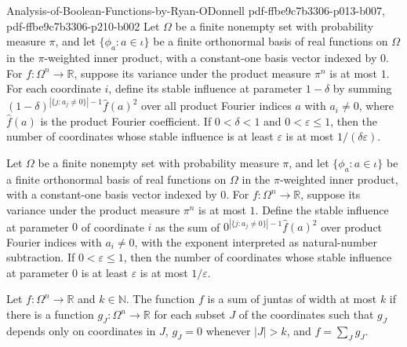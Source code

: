 \begin{theorem}
  {Analysis-of-Boolean-Functions-by-Ryan-ODonnell}
  {pdf-ffbe9c7b3306-p013-b007,
    pdf-ffbe9c7b3306-p210-b002}
Let $\Omega$ be a finite nonempty set with probability measure $\pi$, and let
$\{\phi_a:a\in\iota\}$ be a finite orthonormal basis of real functions on $\Omega$ in
the $\pi$-weighted inner product, with a constant-one basis vector indexed by $0$. For
$f:\Omega^n\to\mathbb R$, suppose its variance under the product measure $\pi^n$ is at
most $1$. For each coordinate $i$, define its stable influence at parameter $1-\delta$
by summing $(1-\delta)^{|\{j:a_j\ne0\}|-1}\widehat f(a)^2$ over all product Fourier
indices $a$ with $a_i\ne0$, where $\widehat f(a)$ is the product Fourier coefficient. If
$0<\delta<1$ and $0<\varepsilon\le1$, then the number of coordinates whose stable
influence is at least $\varepsilon$ is at most $1/(\delta\varepsilon)$.
\end{theorem}

\begin{theorem}
\label{FABL.FiniteFourierBasis.card_stableInfluencePolynomial_zero_ge_le}
\leanok
{}
Let $\Omega$ be a finite nonempty set with probability measure $\pi$, and let
$\{\phi_a:a\in\iota\}$ be a finite orthonormal basis of real functions on $\Omega$ in
the $\pi$-weighted inner product, with a constant-one basis vector indexed by $0$. For
$f:\Omega^n\to\mathbb R$, suppose its variance under the product measure $\pi^n$ is at
most $1$. Define the stable influence at parameter $0$ of coordinate $i$ as the sum of
$0^{|\{j:a_j\ne0\}|-1}\widehat f(a)^2$ over product Fourier indices with $a_i\ne0$, with
the exponent interpreted as natural-number subtraction. If $0<\varepsilon\le1$, then the
number of coordinates whose stable influence at parameter $0$ is at least $\varepsilon$
is at most $1/\varepsilon$.
\end{theorem}

\begin{definition}
\label{FABL.IsSumOfJuntasAtMost}
\leanok
{}
Let $f\colon\Omega^n\to\mathbb{R}$ and $k\in\mathbb{N}$. The function $f$ is a sum of
juntas of width at most $k$ if there is a function $g_J\colon\Omega^n\to\mathbb{R}$ for
each subset $J$ of the coordinates such that $g_J$ depends only on coordinates in $J$,
$g_J=0$ whenever $|J|>k$, and $f=\sum_J g_J$.
\end{definition}

